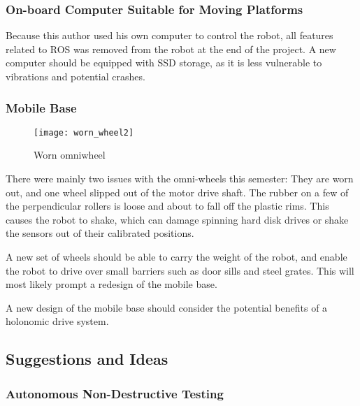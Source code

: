 \subsubsection{On-board Computer Suitable for Moving Platforms}

Because this author used his own computer to control the robot, all features related to \ac{ROS} was removed from the robot at the end of the project. A new computer should be equipped with \ac{SSD} storage, as it is less vulnerable to vibrations and potential crashes.

\subsubsection{Mobile Base}

\begin{wrapfigure}{r}{0.48\textwidth}
	\vspace{-20pt}
	\begin{center}
		\texttt{[image: worn\_wheel2]}
	\end{center}
	
	\caption{Worn omniwheel}
	\label{fig:worn_wheel}
\end{wrapfigure} 

There were mainly two issues with the omni-wheels this semester: They are worn out, and one wheel slipped out of the motor drive shaft. The rubber on a few of the perpendicular rollers is loose and about to fall off the plastic rims. This causes the robot to shake, which can damage spinning hard disk drives or shake the sensors out of their calibrated positions. 

A new set of wheels should be able to carry the weight of the robot, and enable the robot to drive over small barriers such as door sills and steel grates. This will most likely prompt a redesign of the mobile base.

A new design of the mobile base should consider the potential benefits of a holonomic drive system.

\subsection{Suggestions and Ideas}

\subsubsection{Autonomous Non-Destructive Testing}


